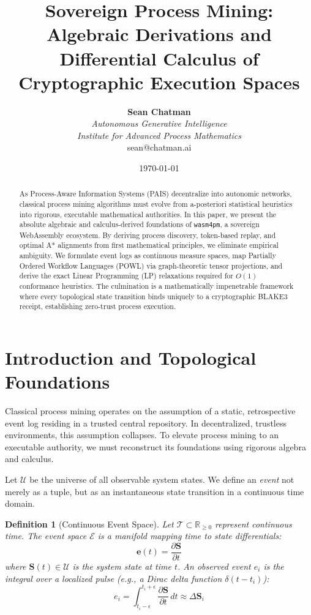 \documentclass[11pt,a4paper,twocolumn]{article}
\title{\Huge \textbf{Sovereign Process Mining:} \\ \Large Algebraic Derivations and Differential Calculus of Cryptographic Execution Spaces}
\author{
    \textbf{Sean Chatman}\\
    \textit{Autonomous Generative Intelligence}\\
    \textit{Institute for Advanced Process Mathematics}\\
    sean@chatman.ai
}
\date{\today}
\newtheorem{definition}{Definition}
\begin{document}
\maketitle

\begin{abstract}
As Process-Aware Information Systems (PAIS) decentralize into autonomic networks, classical process mining algorithms must evolve from a-posteriori statistical heuristics into rigorous, executable mathematical authorities. In this paper, we present the absolute algebraic and calculus-derived foundations of \texttt{wasm4pm}, a sovereign WebAssembly ecosystem. By deriving process discovery, token-based replay, and optimal A* alignments from first mathematical principles, we eliminate empirical ambiguity. We formulate event logs as continuous measure spaces, map Partially Ordered Workflow Languages (POWL) via graph-theoretic tensor projections, and derive the exact Linear Programming (LP) relaxations required for $O(1)$ conformance heuristics. The culmination is a mathematically impenetrable framework where every topological state transition binds uniquely to a cryptographic BLAKE3 receipt, establishing zero-trust process execution.
\end{abstract}

\section{Introduction and Topological Foundations}
Classical process mining operates on the assumption of a static, retrospective event log residing in a trusted central repository. In decentralized, trustless environments, this assumption collapses. To elevate process mining to an executable authority, we must reconstruct its foundations using rigorous algebra and calculus.

Let $\mathcal{U}$ be the universe of all observable system states. We define an \textit{event} not merely as a tuple, but as an instantaneous state transition in a continuous time domain.

\begin{definition}[Continuous Event Space]
Let $\mathcal{T} \subset \mathbb{R}_{\ge 0}$ represent continuous time. The event space $\mathcal{E}$ is a manifold mapping time to state differentials:
\[ \mathbf{e}(t) = \frac{\partial \mathbf{S}}{\partial t} \]
where $\mathbf{S}(t) \in \mathcal{U}$ is the system state at time $t$. An observed event $e_i$ is the integral over a localized pulse (e.g., a Dirac delta function $\delta(t - t_i)$):
\[ e_i = \int_{t_i - \epsilon}^{t_i + \epsilon} \frac{\partial \mathbf{S}}{\partial t} \, dt \approx \Delta \mathbf{S}_i \]
\end{definition}
\end{document}
